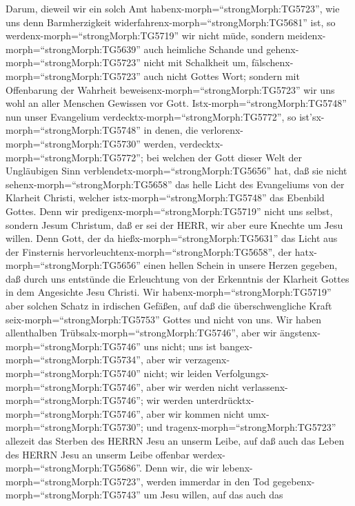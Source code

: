  Darum, dieweil wir ein solch Amt
habenx-morph=``strongMorph:TG5723'', wie uns denn Barmherzigkeit
widerfahrenx-morph=``strongMorph:TG5681'' ist, so
werdenx-morph=``strongMorph:TG5719'' wir nicht müde, 
sondern meidenx-morph=``strongMorph:TG5639'' auch heimliche Schande und
gehenx-morph=``strongMorph:TG5723'' nicht mit Schalkheit um,
fälschenx-morph=``strongMorph:TG5723'' auch nicht Gottes Wort; sondern
mit Offenbarung der Wahrheit beweisenx-morph=``strongMorph:TG5723'' wir
uns wohl an aller Menschen Gewissen vor Gott. 
Istx-morph=``strongMorph:TG5748'' nun unser Evangelium
verdecktx-morph=``strongMorph:TG5772'', so
ist'sx-morph=``strongMorph:TG5748'' in denen, die
verlorenx-morph=``strongMorph:TG5730'' werden,
verdecktx-morph=``strongMorph:TG5772'';  bei welchen der
Gott dieser Welt der Ungläubigen Sinn
verblendetx-morph=``strongMorph:TG5656'' hat, daß sie nicht
sehenx-morph=``strongMorph:TG5658'' das helle Licht des Evangeliums von
der Klarheit Christi, welcher istx-morph=``strongMorph:TG5748'' das
Ebenbild Gottes.  Denn wir
predigenx-morph=``strongMorph:TG5719'' nicht uns selbst, sondern Jesum
Christum, daß er sei der HERR, wir aber eure Knechte um Jesu willen.
 Denn Gott, der da hießx-morph=``strongMorph:TG5631'' das
Licht aus der Finsternis hervorleuchtenx-morph=``strongMorph:TG5658'',
der hatx-morph=``strongMorph:TG5656'' einen hellen Schein in unsere
Herzen gegeben, daß durch uns entstünde die Erleuchtung von der
Erkenntnis der Klarheit Gottes in dem Angesichte Jesu Christi.
 Wir habenx-morph=``strongMorph:TG5719'' aber solchen Schatz
in irdischen Gefäßen, auf daß die überschwengliche Kraft
seix-morph=``strongMorph:TG5753'' Gottes und nicht von uns. 
Wir haben allenthalben Trübsalx-morph=``strongMorph:TG5746'', aber wir
ängstenx-morph=``strongMorph:TG5746'' uns nicht; uns ist
bangex-morph=``strongMorph:TG5734'', aber wir
verzagenx-morph=``strongMorph:TG5740'' nicht;  wir leiden
Verfolgungx-morph=``strongMorph:TG5746'', aber wir werden nicht
verlassenx-morph=``strongMorph:TG5746''; wir werden
unterdrücktx-morph=``strongMorph:TG5746'', aber wir kommen nicht
umx-morph=``strongMorph:TG5730'';  und
tragenx-morph=``strongMorph:TG5723'' allezeit das Sterben des HERRN Jesu
an unserm Leibe, auf daß auch das Leben des HERRN Jesu an unserm Leibe
offenbar werdex-morph=``strongMorph:TG5686''.  Denn wir,
die wir lebenx-morph=``strongMorph:TG5723'', werden immerdar in den Tod
gegebenx-morph=``strongMorph:TG5743'' um Jesu willen, auf das auch das
